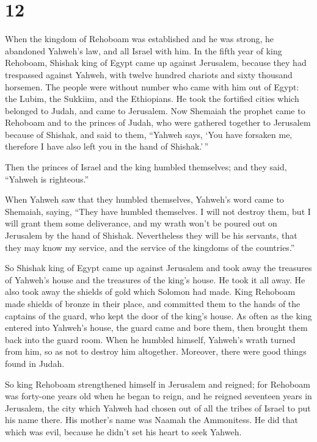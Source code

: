 \hypertarget{section-11}{%
\section{12}\label{section-11}}

 When the kingdom of Rehoboam was established and he was
strong, he abandoned Yahweh's law, and all Israel with him.
 In the fifth year of king Rehoboam, Shishak king of Egypt
came up against Jerusalem, because they had trespassed against Yahweh,
 with twelve hundred chariots and sixty thousand horsemen.
The people were without number who came with him out of Egypt: the
Lubim, the Sukkiim, and the Ethiopians.  He took the
fortified cities which belonged to Judah, and came to Jerusalem.
 Now Shemaiah the prophet came to Rehoboam and to the
princes of Judah, who were gathered together to Jerusalem because of
Shishak, and said to them, ``Yahweh says, `You have forsaken me,
therefore I have also left you in the hand of Shishak.'\,''

 Then the princes of Israel and the king humbled
themselves; and they said, ``Yahweh is righteous.''

 When Yahweh saw that they humbled themselves, Yahweh's
word came to Shemaiah, saying, ``They have humbled themselves. I will
not destroy them, but I will grant them some deliverance, and my wrath
won't be poured out on Jerusalem by the hand of Shishak. 
Nevertheless they will be his servants, that they may know my service,
and the service of the kingdoms of the countries.''

 So Shishak king of Egypt came up against Jerusalem and
took away the treasures of Yahweh's house and the treasures of the
king's house. He took it all away. He also took away the shields of gold
which Solomon had made.  King Rehoboam made shields of
bronze in their place, and committed them to the hands of the captains
of the guard, who kept the door of the king's house.  As
often as the king entered into Yahweh's house, the guard came and bore
them, then brought them back into the guard room.  When
he humbled himself, Yahweh's wrath turned from him, so as not to destroy
him altogether. Moreover, there were good things found in Judah.

 So king Rehoboam strengthened himself in Jerusalem and
reigned; for Rehoboam was forty-one years old when he began to reign,
and he reigned seventeen years in Jerusalem, the city which Yahweh had
chosen out of all the tribes of Israel to put his name there. His
mother's name was Naamah the Ammonitess.  He did that
which was evil, because he didn't set his heart to seek Yahweh.

